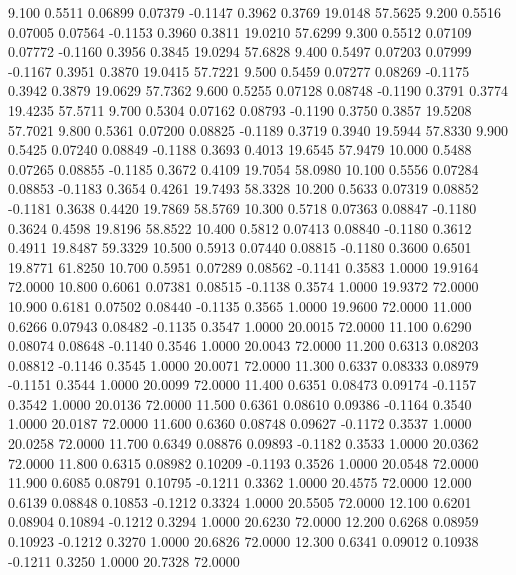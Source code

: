    9.100   0.5511   0.06899   0.07379  -0.1147   0.3962   0.3769  19.0148  57.5625
   9.200   0.5516   0.07005   0.07564  -0.1153   0.3960   0.3811  19.0210  57.6299
   9.300   0.5512   0.07109   0.07772  -0.1160   0.3956   0.3845  19.0294  57.6828
   9.400   0.5497   0.07203   0.07999  -0.1167   0.3951   0.3870  19.0415  57.7221
   9.500   0.5459   0.07277   0.08269  -0.1175   0.3942   0.3879  19.0629  57.7362
   9.600   0.5255   0.07128   0.08748  -0.1190   0.3791   0.3774  19.4235  57.5711
   9.700   0.5304   0.07162   0.08793  -0.1190   0.3750   0.3857  19.5208  57.7021
   9.800   0.5361   0.07200   0.08825  -0.1189   0.3719   0.3940  19.5944  57.8330
   9.900   0.5425   0.07240   0.08849  -0.1188   0.3693   0.4013  19.6545  57.9479
  10.000   0.5488   0.07265   0.08855  -0.1185   0.3672   0.4109  19.7054  58.0980
  10.100   0.5556   0.07284   0.08853  -0.1183   0.3654   0.4261  19.7493  58.3328
  10.200   0.5633   0.07319   0.08852  -0.1181   0.3638   0.4420  19.7869  58.5769
  10.300   0.5718   0.07363   0.08847  -0.1180   0.3624   0.4598  19.8196  58.8522
  10.400   0.5812   0.07413   0.08840  -0.1180   0.3612   0.4911  19.8487  59.3329
  10.500   0.5913   0.07440   0.08815  -0.1180   0.3600   0.6501  19.8771  61.8250
  10.700   0.5951   0.07289   0.08562  -0.1141   0.3583   1.0000  19.9164  72.0000
  10.800   0.6061   0.07381   0.08515  -0.1138   0.3574   1.0000  19.9372  72.0000
  10.900   0.6181   0.07502   0.08440  -0.1135   0.3565   1.0000  19.9600  72.0000
  11.000   0.6266   0.07943   0.08482  -0.1135   0.3547   1.0000  20.0015  72.0000
  11.100   0.6290   0.08074   0.08648  -0.1140   0.3546   1.0000  20.0043  72.0000
  11.200   0.6313   0.08203   0.08812  -0.1146   0.3545   1.0000  20.0071  72.0000
  11.300   0.6337   0.08333   0.08979  -0.1151   0.3544   1.0000  20.0099  72.0000
  11.400   0.6351   0.08473   0.09174  -0.1157   0.3542   1.0000  20.0136  72.0000
  11.500   0.6361   0.08610   0.09386  -0.1164   0.3540   1.0000  20.0187  72.0000
  11.600   0.6360   0.08748   0.09627  -0.1172   0.3537   1.0000  20.0258  72.0000
  11.700   0.6349   0.08876   0.09893  -0.1182   0.3533   1.0000  20.0362  72.0000
  11.800   0.6315   0.08982   0.10209  -0.1193   0.3526   1.0000  20.0548  72.0000
  11.900   0.6085   0.08791   0.10795  -0.1211   0.3362   1.0000  20.4575  72.0000
  12.000   0.6139   0.08848   0.10853  -0.1212   0.3324   1.0000  20.5505  72.0000
  12.100   0.6201   0.08904   0.10894  -0.1212   0.3294   1.0000  20.6230  72.0000
  12.200   0.6268   0.08959   0.10923  -0.1212   0.3270   1.0000  20.6826  72.0000
  12.300   0.6341   0.09012   0.10938  -0.1211   0.3250   1.0000  20.7328  72.0000
